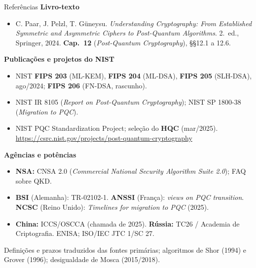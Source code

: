 \documentclass{beamer}
\begin{document}
\begin{frame}{Referências}
    \scriptsize
    \textbf{Livro-texto}
    \begin{itemize}
        \item C. Paar, J. Pelzl, T. Güneysu. \textit{Understanding Cryptography: From Established Symmetric and Asymmetric Ciphers to Post-Quantum Algorithms}. 2.\ ed., Springer, 2024. \textbf{Cap.\ 12} (\textit{Post-Quantum Cryptography}), §§12.1 a 12.6.
    \end{itemize}
    \smallskip
    \textbf{Publicações e projetos do NIST}
    \begin{itemize}
        \item NIST \textbf{FIPS 203} (ML-KEM), \textbf{FIPS 204} (ML-DSA), \textbf{FIPS 205} (SLH-DSA), ago/2024; \textbf{FIPS 206} (FN-DSA, rascunho).
        \item NIST IR 8105 (\textit{Report on Post-Quantum Cryptography}); NIST SP 1800-38 (\textit{Migration to PQC}).
        \item NIST PQC Standardization Project; seleção do \textbf{HQC} (mar/2025). \url{https://csrc.nist.gov/projects/post-quantum-cryptography}
    \end{itemize}
    \smallskip
    \textbf{Agências e potências}
    \begin{itemize}
        \item \textbf{NSA:} CNSA 2.0 (\textit{Commercial National Security Algorithm Suite 2.0}); FAQ sobre QKD.
        \item \textbf{BSI} (Alemanha): TR-02102-1. \textbf{ANSSI} (França): \textit{views on PQC transition}. \textbf{NCSC} (Reino Unido): \textit{Timelines for migration to PQC} (2025).
        \item \textbf{China:} ICCS/OSCCA (chamada de 2025). \textbf{Rússia:} TC26 / Academia de Criptografia. ENISA; ISO/IEC JTC 1/SC 27.
    \end{itemize}
    \smallskip
    {\tiny Definições e prazos traduzidos das fontes primárias; algoritmos de Shor (1994) e Grover (1996); desigualdade de Mosca (2015/2018).}
\end{frame}
\end{document}
